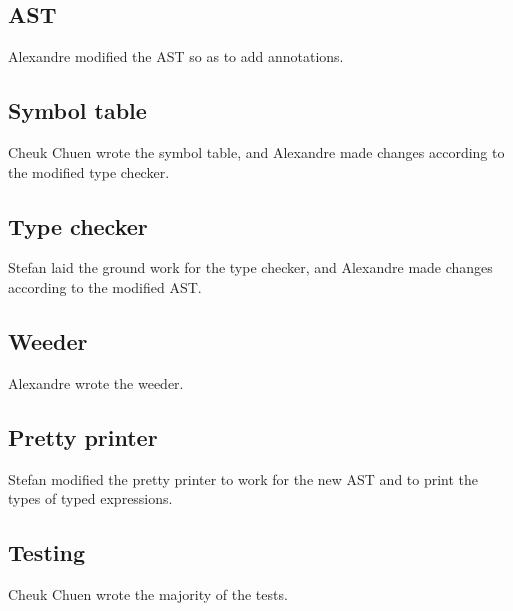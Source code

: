 \documentclass{article}
\begin{document}
\subsection*{AST}
Alexandre modified the AST so as to add annotations.

\subsection*{Symbol table}
Cheuk Chuen wrote the symbol table, and Alexandre made changes according to the modified type checker.

\subsection*{Type checker}
Stefan laid the ground work for the type checker, and Alexandre made changes according to the modified AST.

\subsection*{Weeder}
Alexandre wrote the weeder.

\subsection*{Pretty printer}
Stefan modified the pretty printer to work for the new AST and to print the types of typed expressions.

\subsection*{Testing}
Cheuk Chuen wrote the majority of the tests.
\end{document}
